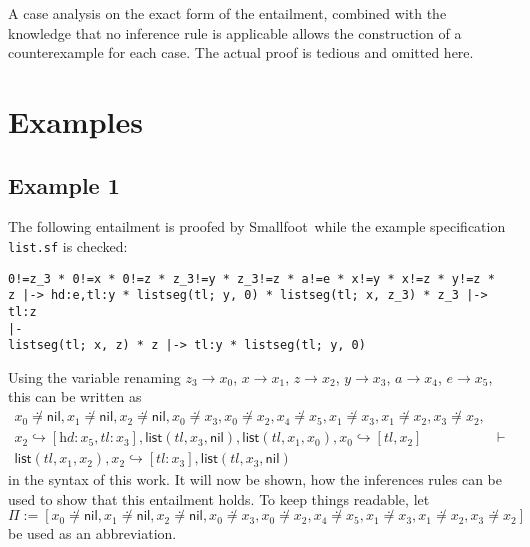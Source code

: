 \documentclass{scrartcl}
\theoremstyle{definition}
\newcommand{\smallfoot}{{\sf Smallfoot}}
\newcommand{\nil}{{\textsf{nil}}}
\newcommand{\pfunequal}[2]{\ensuremath{#1 \not\doteq #2}}
\newcommand{\sfpointsto}[2]{#1 \hookrightarrow [#2]}
\newcommand{\sflist}{{\textsf{list}}}
\begin{document}
A case analysis on the exact form of the entailment, combined with the
knowledge that no inference rule is applicable allows the construction of a
counterexample for each case. The actual proof is tedious and omitted here.


\section{Examples}
\subsection{Example 1}

The following entailment is proofed  by \smallfoot\ while the example
specification \texttt{list.sf} is checked:
%
\begin{verbatim}
0!=z_3 * 0!=x * 0!=z * z_3!=y * z_3!=z * a!=e * x!=y * x!=z * y!=z * 
z |-> hd:e,tl:y * listseg(tl; y, 0) * listseg(tl; x, z_3) * z_3 |-> tl:z 
|-
listseg(tl; x, z) * z |-> tl:y * listseg(tl; y, 0)
\end{verbatim}
%
Using the variable renaming $z_3 \to x_0$, $x \to x_1$, $z \to x_2$, $y
\to x_3$, $a \to x_4$, $e \to x_5$, this can be written as 
\[\begin{array}{lr}
\pfunequal {x_0} \nil,\pfunequal {x_1} \nil, \pfunequal {x_2} \nil,
\pfunequal {x_0} {x_3}, \pfunequal {x_0} {x_2}, \pfunequal {x_4} {x_5},
\pfunequal {x_1} {x_3},
\pfunequal {x_1} {x_2}, \pfunequal {x_3} {x_2},\\
\sfpointsto {x_2} {\textit{hd}:x_5, \textit{tl}:x_3},
\sflist(\textit{tl},x_3,\nil), \sflist(\textit{tl},x_1,x_0),
\sfpointsto {x_0} {\textit{tl},x_2} & \vdash \\
\sflist(\textit{tl},x_1,x_2), \sfpointsto {x_2} {\textit{tl}:x_3}, \sflist(\textit{tl},x_3,\nil)
\end{array}
\]
%
in the syntax of this work. It will now be shown, how the inferences rules can
be used to show that this entailment holds. To keep things readable, let $\Pi := [\pfunequal {x_0} \nil,\pfunequal {x_1} \nil, \pfunequal {x_2} \nil,
\pfunequal {x_0} {x_3}, \pfunequal {x_0} {x_2}, \pfunequal {x_4} {x_5},
\pfunequal {x_1} {x_3},
\pfunequal {x_1} {x_2}, \pfunequal {x_3} {x_2}]$ be used as an abbreviation.
\end{document}
